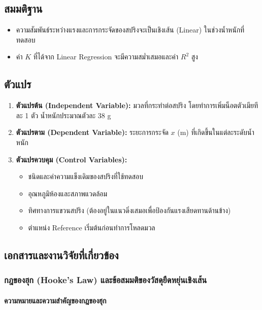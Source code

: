\subsection{สมมติฐาน}
\begin{itemize}
    \item ความสัมพันธ์ระหว่างแรงและการกระจัดของสปริงจะเป็นเชิงเส้น (Linear) ในช่วงน้ำหนักที่ทดสอบ
    \item ค่า $K$ ที่ได้จาก Linear Regression จะมีความสม่ำเสมอและค่า $R^2$ สูง
\end{itemize}

\subsection{ตัวแปร}
\begin{enumerate}
    \item \textbf{ตัวแปรต้น (Independent Variable):} มวลที่กระทำต่อสปริง โดยทำการเพิ่มน็อตตัวเมียทีละ 1 ตัว น้ำหนักประมาณตัวละ 38 g
    \item \textbf{ตัวแปรตาม (Dependent Variable):} ระยะการกระจัด $x$ (m) ที่เกิดขึ้นในแต่ละระดับน้ำหนัก
    \item \textbf{ตัวแปรควบคุม (Control Variables):}
    \begin{itemize}
        \item ชนิดและค่าความแข็งเดิมของสปริงที่ใช้ทดสอบ
        \item อุณหภูมิห้องและสภาพแวดล้อม
        \item ทิศทางการแขวนสปริง (ต้องอยู่ในแนวดิ่งเสมอเพื่อป้องกันแรงเสียดทานด้านข้าง)
        \item ตำแหน่ง Reference เริ่มต้นก่อนทำการโหลดมวล
    \end{itemize}
\end{enumerate}

\subsection{เอกสารและงานวิจัยที่เกี่ยวข้อง}

\subsubsection{กฎของฮุก (Hooke's Law) และข้อสมมติของวัสดุยืดหยุ่นเชิงเส้น}

\paragraph{ความหมายและความสำคัญของกฎของฮุก}

